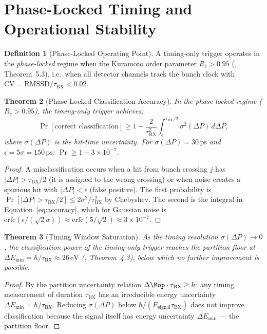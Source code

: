 \documentclass[twocolumn,10pt,a4paper]{article}
\theoremstyle{thmstyle}
\newtheorem{theorem}{Theorem}[section]
\theoremstyle{definition}
\newtheorem{definition}[theorem]{Definition}
\theoremstyle{remark}
\newcommand{\tBX}{\tau_{\mathrm{BX}}}
\newcommand{\DeltaP}{\Delta P}
\begin{document}
\section{Phase-Locked Timing and Operational Stability}
\label{sec:phaselocked}

\begin{definition}[Phase-Locked Operating Point]
A timing-only trigger operates in the \emph{phase-locked} regime when
the Kuramoto order parameter $R_c > 0.95$ (\citealt{companion:qnd},
Theorem~5.3), i.e.\ when all detector channels track the bunch clock
with $\mathrm{CV} = \mathrm{RMSSD}/\tBX < 0.02$.
\end{definition}

\begin{theorem}[Phase-Locked Classification Accuracy]
\label{thm:phase_locked_acc}
In the phase-locked regime ($R_c > 0.95$), the timing-only trigger
achieves:
\begin{equation}
\Pr[\text{correct classification}] \geq 1 - \frac{2}{\tBX^2}
\int_\epsilon^{\tBX/2}\sigma^2(\DeltaP)\,d\DeltaP,
\label{eq:accuracy}
\end{equation}
where $\sigma(\DeltaP)$ is the hit-time uncertainty.
For $\sigma(\DeltaP) = 30\,\mathrm{ps}$ and $\epsilon = 5\sigma
= 150\,\mathrm{ps}$: $\Pr \geq 1 - 3\times10^{-7}$.
\end{theorem}

\begin{proof}
A misclassification occurs when a hit from bunch crossing $j$ has
$|\DeltaP| > \tBX/2$ (it is assigned to the wrong crossing) or
when noise creates a spurious hit with $|\DeltaP| < \epsilon$
(false positive). The first probability is
$\Pr[|\DeltaP| > \tBX/2] \leq 2\sigma^2/\tBX^2$ by Chebyshev.
The second is the integral in Equation~\eqref{eq:accuracy},
which for Gaussian noise is $\mathrm{erfc}(\epsilon/(\sqrt{2}\sigma))
\approx \mathrm{erfc}(5/\sqrt{2}) \approx 3\times10^{-7}$.
\end{proof}

\begin{theorem}[Timing Window Saturation]
\label{thm:saturation}
As the timing resolution $\sigma(\DeltaP) \to 0$, the classification
power of the timing-only trigger reaches the partition floor at
$\Delta E_{\min} = \hbar/\tBX \approx 26\,\mathrm{eV}$
(\citealt{companion:spectrometer}, Theorem~4.3), below which no further
improvement is possible.
\end{theorem}

\begin{proof}
By the partition uncertainty relation $\Delta\Mop\cdot\tBX \geq \hbar$:
any timing measurement of duration $\tBX$ has an irreducible energy
uncertainty $\Delta E_{\min} = \hbar/\tBX$. Reducing $\sigma(\DeltaP)$
below $\hbar/(E_{\mathrm{signal}}\tBX)$ does not improve classification
because the signal itself has energy uncertainty $\Delta E_{\min}$
--- the partition floor.
\end{proof}
\end{document}
